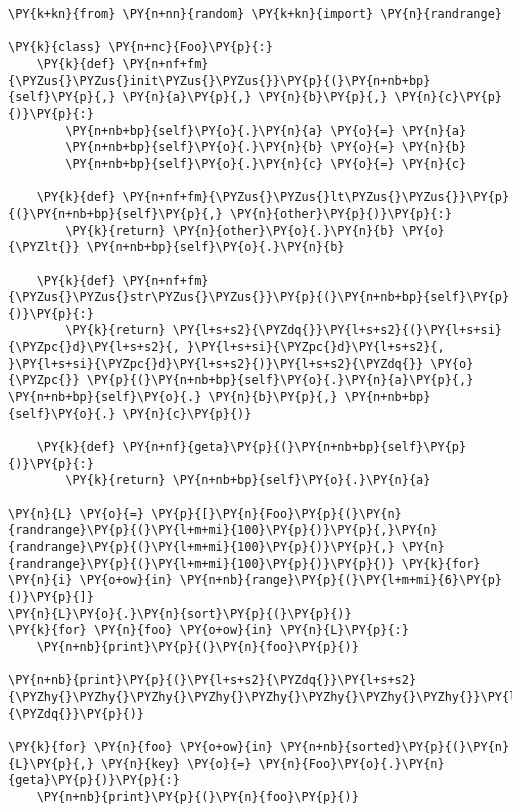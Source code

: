\begin{Verbatim}[commandchars=\\\{\}]
\PY{k+kn}{from} \PY{n+nn}{random} \PY{k+kn}{import} \PY{n}{randrange}

\PY{k}{class} \PY{n+nc}{Foo}\PY{p}{:}
    \PY{k}{def} \PY{n+nf+fm}{\PYZus{}\PYZus{}init\PYZus{}\PYZus{}}\PY{p}{(}\PY{n+nb+bp}{self}\PY{p}{,} \PY{n}{a}\PY{p}{,} \PY{n}{b}\PY{p}{,} \PY{n}{c}\PY{p}{)}\PY{p}{:}
        \PY{n+nb+bp}{self}\PY{o}{.}\PY{n}{a} \PY{o}{=} \PY{n}{a}
        \PY{n+nb+bp}{self}\PY{o}{.}\PY{n}{b} \PY{o}{=} \PY{n}{b}
        \PY{n+nb+bp}{self}\PY{o}{.}\PY{n}{c} \PY{o}{=} \PY{n}{c}

    \PY{k}{def} \PY{n+nf+fm}{\PYZus{}\PYZus{}lt\PYZus{}\PYZus{}}\PY{p}{(}\PY{n+nb+bp}{self}\PY{p}{,} \PY{n}{other}\PY{p}{)}\PY{p}{:}
        \PY{k}{return} \PY{n}{other}\PY{o}{.}\PY{n}{b} \PY{o}{\PYZlt{}} \PY{n+nb+bp}{self}\PY{o}{.}\PY{n}{b}

    \PY{k}{def} \PY{n+nf+fm}{\PYZus{}\PYZus{}str\PYZus{}\PYZus{}}\PY{p}{(}\PY{n+nb+bp}{self}\PY{p}{)}\PY{p}{:}
        \PY{k}{return} \PY{l+s+s2}{\PYZdq{}}\PY{l+s+s2}{(}\PY{l+s+si}{\PYZpc{}d}\PY{l+s+s2}{, }\PY{l+s+si}{\PYZpc{}d}\PY{l+s+s2}{, }\PY{l+s+si}{\PYZpc{}d}\PY{l+s+s2}{)}\PY{l+s+s2}{\PYZdq{}} \PY{o}{\PYZpc{}} \PY{p}{(}\PY{n+nb+bp}{self}\PY{o}{.}\PY{n}{a}\PY{p}{,} \PY{n+nb+bp}{self}\PY{o}{.} \PY{n}{b}\PY{p}{,} \PY{n+nb+bp}{self}\PY{o}{.} \PY{n}{c}\PY{p}{)}

    \PY{k}{def} \PY{n+nf}{geta}\PY{p}{(}\PY{n+nb+bp}{self}\PY{p}{)}\PY{p}{:}
        \PY{k}{return} \PY{n+nb+bp}{self}\PY{o}{.}\PY{n}{a}

\PY{n}{L} \PY{o}{=} \PY{p}{[}\PY{n}{Foo}\PY{p}{(}\PY{n}{randrange}\PY{p}{(}\PY{l+m+mi}{100}\PY{p}{)}\PY{p}{,}\PY{n}{randrange}\PY{p}{(}\PY{l+m+mi}{100}\PY{p}{)}\PY{p}{,} \PY{n}{randrange}\PY{p}{(}\PY{l+m+mi}{100}\PY{p}{)}\PY{p}{)} \PY{k}{for} \PY{n}{i} \PY{o+ow}{in} \PY{n+nb}{range}\PY{p}{(}\PY{l+m+mi}{6}\PY{p}{)}\PY{p}{]}
\PY{n}{L}\PY{o}{.}\PY{n}{sort}\PY{p}{(}\PY{p}{)}
\PY{k}{for} \PY{n}{foo} \PY{o+ow}{in} \PY{n}{L}\PY{p}{:}
    \PY{n+nb}{print}\PY{p}{(}\PY{n}{foo}\PY{p}{)}

\PY{n+nb}{print}\PY{p}{(}\PY{l+s+s2}{\PYZdq{}}\PY{l+s+s2}{\PYZhy{}\PYZhy{}\PYZhy{}\PYZhy{}\PYZhy{}\PYZhy{}\PYZhy{}\PYZhy{}}\PY{l+s+s2}{\PYZdq{}}\PY{p}{)}

\PY{k}{for} \PY{n}{foo} \PY{o+ow}{in} \PY{n+nb}{sorted}\PY{p}{(}\PY{n}{L}\PY{p}{,} \PY{n}{key} \PY{o}{=} \PY{n}{Foo}\PY{o}{.}\PY{n}{geta}\PY{p}{)}\PY{p}{:}
    \PY{n+nb}{print}\PY{p}{(}\PY{n}{foo}\PY{p}{)}
\end{Verbatim}

